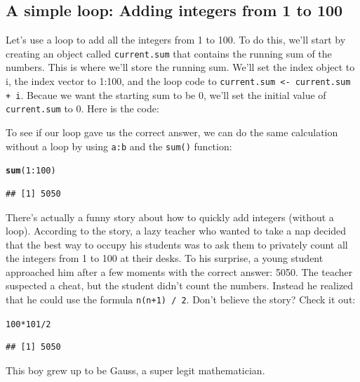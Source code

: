 \documentclass{tufte-book}\usepackage[]{graphicx}\usepackage[]{color}
\makeatletter
\newcommand{\hlnum}[1]{\textcolor[rgb]{0.686,0.059,0.569}{#1}}%
\newcommand{\hlopt}[1]{\textcolor[rgb]{0,0,0}{#1}}%
\newcommand{\hlstd}[1]{\textcolor[rgb]{0.345,0.345,0.345}{#1}}%
\newcommand{\hlkwd}[1]{\textcolor[rgb]{0.737,0.353,0.396}{\textbf{#1}}}%
\newenvironment{kframe}{%
 \def\at@end@of@kframe{}%
 \ifinner\ifhmode%
  \def\at@end@of@kframe{\end{minipage}}%
  \begin{minipage}{\columnwidth}%
 \fi\fi%
 \def\FrameCommand##1{\hskip\@totalleftmargin \hskip-\fboxsep
 \colorbox{shadecolor}{##1}\hskip-\fboxsep
     \hskip-\linewidth \hskip-\@totalleftmargin \hskip\columnwidth}%
 \MakeFramed {\advance\hsize-\width
   \@totalleftmargin\z@ \linewidth\hsize
   \@setminipage}}%
 {\par\unskip\endMakeFramed%
 \at@end@of@kframe}
\newenvironment{knitrout}{}{} %
\makeatother
\begin{document}
\subsection{A simple loop: Adding integers from 1 to 100}

Let's use a loop to add all the integers from 1 to 100. To do this, we'll start by creating an object called \texttt{current.sum} that contains the running sum of the numbers. This is where we'll store the running sum. We'll set the index object to i, the index vector to 1:100, and the loop code to \texttt{current.sum <- current.sum + i}. Becaue we want the starting sum to be 0, we'll set the initial value of \texttt{current.sum} to 0. Here is the code:

\begin{marginfigure}
To see if our loop gave us the correct answer, we can do the same calculation without a loop by using \texttt{a:b} and the \texttt{sum()} function:

\begin{knitrout}
\color{fgcolor}\begin{kframe}
\begin{alltt}
\hlkwd{sum}\hlstd{(}\hlnum{1}\hlopt{:}\hlnum{100}\hlstd{)}
\end{alltt}
\begin{verbatim}
## [1] 5050
\end{verbatim}
\end{kframe}
\end{knitrout}

There's actually a funny story about how to quickly add integers (without a loop). According to the story, a lazy teacher who wanted to take a nap decided that the best way to occupy his students was to ask them to privately count all the integers from 1 to 100 at their desks. To his surprise, a young student approached him after a few moments with the correct answer: 5050. The teacher suspected a cheat, but the student didn't count the numbers. Instead he realized that he could use the formula \texttt{n(n+1) / 2}. Don't believe the story? Check it out:
\begin{knitrout}
\color{fgcolor}\begin{kframe}
\begin{alltt}
\hlnum{100} \hlopt{*} \hlnum{101} \hlopt{/} \hlnum{2}
\end{alltt}
\begin{verbatim}
## [1] 5050
\end{verbatim}
\end{kframe}
\end{knitrout}
This boy grew up to be Gauss, a super legit mathematician.
\vspace{.5cm}


\end{marginfigure}
\end{document}
